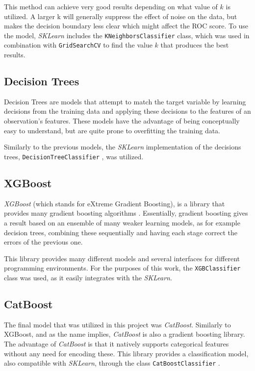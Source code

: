 \documentclass{IEEEtran}
\begin{document}
This method can achieve very good results depending on what value of $k$ is utilized. A larger k will generally suppress the effect of noise on the data, but makes the decision boundary less clear which might affect the ROC score. To use the model, \textit{SKLearn} includes the \texttt{KNeighborsClassifier} \cite{b11} class, which was used in combination with \texttt{GridSearchCV} to find the value $k$ that produces the best results.

\subsection{Decision Trees}

Decision Trees are models that attempt to match the target variable by learning decisions from the training data and applying these decisions to the features of an observation's features. These models have the advantage of being conceptually easy to understand, but are quite prone to overfitting the training data.

Similarly to the previous models, the \textit{SKLearn} implementation of the decisions trees, \texttt{DecisionTreeClassifier} \cite{b12}, was utilized.

\subsection{XGBoost}

\textit{XGBoost} (which stands for eXtreme Gradient Boosting), is a library that provides many gradient boosting algorithms \cite{b13}. Essentially, gradient boosting gives a result based on an ensemble of many weaker learning models, as for example decision trees, combining these sequentially and having each stage correct the errors of the previous one.

This library provides many different models and several interfaces for different programming environments. For the purposes of this work, the \texttt{XGBClassifier} class was used, as it easily integrates with the \textit{SKLearn}.

\subsection{CatBoost}

The final model that was utilized in this project was \textit{CatBoost}. Similarly to XGBoost, and as the name implies, \textit{CatBoost} is also a gradient boosting library. The advantage of \textit{CatBoost} is that it natively supports categorical features without any need for encoding these. This library provides a classification model, also compatible with \textit{SKLearn}, through the class \texttt{CatBoostClassifier} \cite{b14}.
\end{document}
